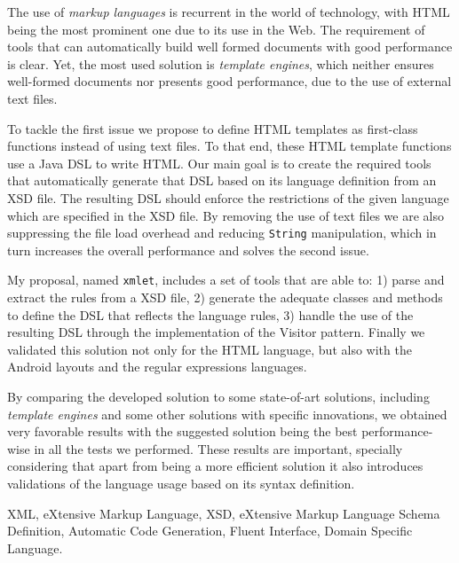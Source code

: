 \abstractEN %

The use of \textit{markup languages} is recurrent in the world of technology, with \ac{HTML} being the most prominent one due to its use in the Web. The requirement of tools that can automatically build well formed documents with good performance is clear. Yet, the most used solution is \textit{template engines}, which neither ensures well-formed documents nor presents good performance, due to the use of external text files.

\noindent
To tackle the first issue we propose to define \ac{HTML} templates as first-class functions instead of using text files. To that end, these \ac{HTML} template functions use a Java \ac{DSL} to write \ac{HTML}. Our main goal is to create the required tools that automatically generate that \ac{DSL} based on its language definition from an \ac{XSD} file. The resulting \ac{DSL} should enforce the restrictions of the given language which are specified in the \ac{XSD} file. By removing the use of text files we are also suppressing the file load overhead and reducing \texttt{String} manipulation, which in turn increases the overall performance and solves the second issue.

\noindent
My proposal, named \texttt{xmlet}, includes a set of tools that are able to: 1) parse and extract the rules from a \ac{XSD} file, 2) generate the adequate classes and methods to define the \ac{DSL} that reflects the language rules, 3) handle the use of the resulting \ac{DSL} through the implementation of the Visitor pattern. Finally we validated this solution not only for the \ac{HTML} language, but also with the Android layouts and the regular expressions languages.

\noindent
By comparing the developed solution to some state-of-art solutions, including \textit{template engines} and some other solutions with specific innovations, we obtained very favorable results with the suggested solution being the best performance-wise in all the tests we performed. These results are important, specially considering that apart from being a more efficient solution it also introduces validations of the language usage based on its syntax definition.

\begin{keywords}
XML, eXtensive Markup Language, XSD, eXtensive Markup Language Schema Definition, Automatic Code Generation, Fluent Interface, Domain Specific Language.
\end{keywords} 
